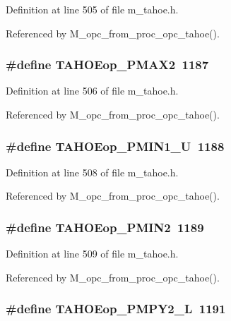 Definition at line 505 of file m\_\-tahoe.h.

Referenced by M\_\-opc\_\-from\_\-proc\_\-opc\_\-tahoe().
\subsubsection{\setlength{\rightskip}{0pt plus 5cm}\#define TAHOEop\_\-PMAX2~1187}\label{m__tahoe_8h_d83e4e4d63f5a2cd17eb9147b9d7cdfd}




Definition at line 506 of file m\_\-tahoe.h.

Referenced by M\_\-opc\_\-from\_\-proc\_\-opc\_\-tahoe().
\subsubsection{\setlength{\rightskip}{0pt plus 5cm}\#define TAHOEop\_\-PMIN1\_\-U~1188}\label{m__tahoe_8h_1abe89decba0302de0a88c088c7843f4}




Definition at line 508 of file m\_\-tahoe.h.

Referenced by M\_\-opc\_\-from\_\-proc\_\-opc\_\-tahoe().
\subsubsection{\setlength{\rightskip}{0pt plus 5cm}\#define TAHOEop\_\-PMIN2~1189}\label{m__tahoe_8h_8df0d991cc4530f4fd052bc557981737}




Definition at line 509 of file m\_\-tahoe.h.

Referenced by M\_\-opc\_\-from\_\-proc\_\-opc\_\-tahoe().
\subsubsection{\setlength{\rightskip}{0pt plus 5cm}\#define TAHOEop\_\-PMPY2\_\-L~1191}\label{m__tahoe_8h_1156cf88e4d56aa14d49986bdaca9d01}




